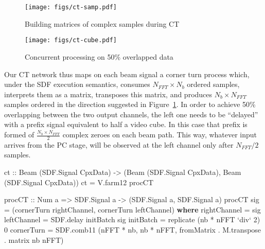 \documentclass[
  a4paper,
]{article}
\newenvironment{Shaded}{}{}
\newcommand{\DataTypeTok}[1]{\textcolor[rgb]{0.56,0.13,0.00}{#1}}
\newcommand{\DecValTok}[1]{\textcolor[rgb]{0.25,0.63,0.44}{#1}}
\newcommand{\FunctionTok}[1]{\textcolor[rgb]{0.02,0.16,0.49}{#1}}
\newcommand{\KeywordTok}[1]{\textcolor[rgb]{0.00,0.44,0.13}{\textbf{#1}}}
\newcommand{\NormalTok}[1]{#1}
\newcommand{\OtherTok}[1]{\textcolor[rgb]{0.00,0.44,0.13}{#1}}
\begin{document}
\begin{figure}
\hypertarget{fig:ct-samp}{%
\centering
\texttt{[image: figs/ct-samp.pdf]}
\caption{Building matrices of complex samples during
CT}\label{fig:ct-samp}
}
\end{figure}

\begin{figure}
\hypertarget{fig:ct-cube}{%
\centering
\texttt{[image: figs/ct-cube.pdf]}
\caption{Concurrent processing on 50\% overlapped
data}\label{fig:ct-cube}
}
\end{figure}

Our CT network thus maps on each beam signal a corner turn process
which, under the SDF execution semantics, consumes \(N_{FFT}\times N_b\)
ordered samples, interprets them as a matrix, transposes this matrix,
and produces \(N_b\times N_{FFT}\) samples ordered in the direction
suggested in Figure~\ref{fig:ct-samp}. In order to achieve 50\%
overlapping between the two output channels, the left one needs to be
``delayed'' with a prefix signal equivalent to half a video cube. In
this case that prefix is formed of \(\frac{N_b \times N_{FFT}}{2}\)
complex zeroes on each beam path. This way, whatever input arrives from
the PC stage, will be observed at the left channel only after
\(N_{FFT}/2\) samples.

\begin{Shaded}
\begin{Highlighting}[numbers=left,,firstnumber=271,]
\OtherTok{ct ::} \DataTypeTok{Beam}\NormalTok{ (}\DataTypeTok{SDF.Signal} \DataTypeTok{CpxData}\NormalTok{)}
   \OtherTok{->}\NormalTok{ (}\DataTypeTok{Beam}\NormalTok{ (}\DataTypeTok{SDF.Signal} \DataTypeTok{CpxData}\NormalTok{),}
       \DataTypeTok{Beam}\NormalTok{ (}\DataTypeTok{SDF.Signal} \DataTypeTok{CpxData}\NormalTok{))}
\NormalTok{ct }\FunctionTok{=}\NormalTok{ V.farm12 procCT}

\OtherTok{procCT ::} \DataTypeTok{Num}\NormalTok{ a }\OtherTok{=>} \DataTypeTok{SDF.Signal}\NormalTok{ a }\OtherTok{->}\NormalTok{ (}\DataTypeTok{SDF.Signal}\NormalTok{ a, }\DataTypeTok{SDF.Signal}\NormalTok{ a)}
\NormalTok{procCT sig }\FunctionTok{=}\NormalTok{ (cornerTurn rightChannel, cornerTurn leftChannel)}
  \KeywordTok{where}
\NormalTok{    rightChannel }\FunctionTok{=}\NormalTok{ sig}
\NormalTok{    leftChannel  }\FunctionTok{=}\NormalTok{ SDF.delay initBatch sig}
\NormalTok{    initBatch    }\FunctionTok{=} \FunctionTok{replicate}\NormalTok{ (nb }\FunctionTok{*}\NormalTok{ nFFT }\OtherTok{`div`} \DecValTok{2}\NormalTok{) }\DecValTok{0}
\NormalTok{    cornerTurn   }\FunctionTok{=}\NormalTok{ SDF.comb11 (nFFT }\FunctionTok{*}\NormalTok{ nb, nb }\FunctionTok{*}\NormalTok{ nFFT,}
\NormalTok{                               fromMatrix }\FunctionTok{.}\NormalTok{ M.transpose }\FunctionTok{.}\NormalTok{ matrix nb nFFT)}
\end{Highlighting}
\end{Shaded}
\end{document}
